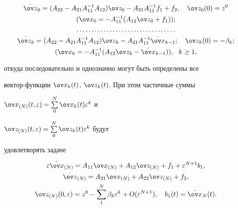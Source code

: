 \begin{gather*} 


\Dot{\ov z}_0=(A_{22}-A_{21}A^{-1}_{11}A_{12})\ov z_0- 


A_{21}A^{-1}_{11}f_1+f_2,\quad \ov z_0(0)=z^0 \\ 


(\ov x_0=-A^{-1}_{11}(A_{12}\ov z_0+f_1));\\ 


% 


\dotsc\dotsc\dotsc\dotsc\dotsc\dotsc\dotsc\dotsc\dotsc\dotsc\dotsc \\ 


% 


\Dot{\ov z_k}=(A_{22}-A_{21}A^{-1}_{11}A_{12})\ov z_k- 


A_{21}A^{-1}_{11}\Dot{\ov x}_{k-1};\quad 


\ov z_k(0)=-\beta_k;\\ 


(\ov x_k=-A^{-1}_{11}(A_{12}\ov z_k-\Dot{\ov x}_{k-1})), 


\ \ k\ge1, 


\end{gather*} 


откуда последовательно и однозначно могут быть определены все 


вектор-функции $\ov x_k(t)$, $\ov z_k(t)$. При этом частичные суммы 


$\ov x_{(N)}(t,\varepsilon)=\sum\limits^N_0\ov x_k(t)\varepsilon^k$ и 


$\ov z_{(N)}(t,\varepsilon)=\sum\limits^N_0\ov z_k(t)\varepsilon^k$ будут 


удовлетворять задаче 


\begin{gather*} 


\varepsilon\Dot{\ov x}_{(N)}=A_{11}\ov x_{(N)}+A_{12} 


\ov z_{(N)}+f_1+\varepsilon^{N+1}b_1,\\ 


% 


\Dot{\ov z}_{(N)}=A_{21}\ov x_{(N)}+A_{22}\ov z_{(N)}+f_2,\\ 


% 


\ov z_{(N)}(0,\varepsilon)=z^0-\sum^N_1 \beta_k \varepsilon^k 


+O(\varepsilon^{N+1}),\quad 


b_1(t)=\Dot{\ov x}_N(t). 


\end{gather*} 


